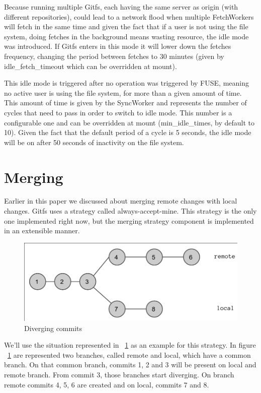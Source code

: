 Because running multiple Gitfs, each having the same server as origin (with different repositories), could lead to a network flood when multiple FetchWorkers will fetch in the same time and given the fact that if a user is not using the file system, doing fetches in the background means wasting resource, the idle mode was introduced. If Gitfs enters in this mode it will lower down the fetches frequency, changing the period between fetches to 30 minutes (given by idle\_fetch\_timeout which can be overridden at mount).

This idle mode is triggered after no operation was triggered by FUSE, meaning no active user is using the file system, for more than a given amount of time. This amount of time is given by the SyncWorker and represents the number of cycles that need to pass in order to switch to idle mode. This number is a configurable one and can be overridden at mount (min\_idle\_times, by default to 10). Given the fact that the default period of a cycle is 5 seconds, the idle mode will be on after 50 seconds of inactivity on the file system.

\section{Merging}

Earlier in this paper we discussed about merging remote changes with local changes. Gitfs uses a strategy called always-accept-mine. This strategy is the only one implemented right now, but the merging strategy component is implemented in an extensible manner.

\begin{figure}[h]
  \begin{center}
    \includegraphics[width=16cm]{layout/commits.png}
  \end{center}
  \caption{Diverging commits}
  \label{fig:commits}
\end{figure}

We'll use the situation represented in ~\ref{fig:commits} as an example for this strategy. In figure ~\ref{fig:commits} are represented two branches, called remote and local, which have a common branch. On that common branch, commits 1, 2 and 3 will be present on local and remote branch. From commit 3, those branches start diverging. On branch remote commits 4, 5, 6 are created and on local, commits 7 and 8.

